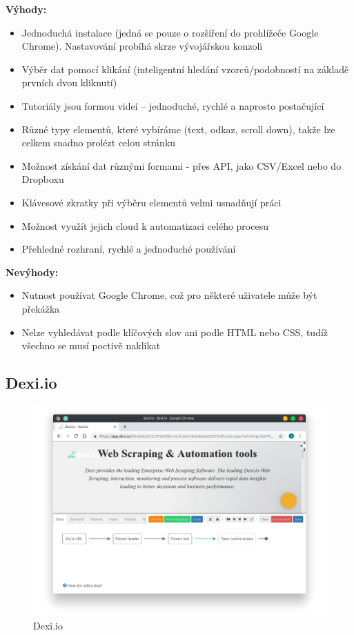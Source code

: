 \documentclass[thesis=B,czech]{FITthesis}[2012/06/26]
\begin{document}
\textbf{Výhody:}
\begin{itemize}
	\item Jednoduchá instalace (jedná se pouze o rozšíření do prohlížeče Google Chrome). Nastavování probíhá skrze vývojářskou konzoli
	\item Výběr dat pomocí klikání (inteligentní hledání vzorců/podobností na základě prvních dvou kliknutí)
	\item Tutoriály jsou formou videí -- jednoduché, rychlé a naprosto postačující
	\item Různé typy elementů, které vybíráme (text, odkaz, scroll down), takže lze celkem snadno prolézt celou stránku
	\item Možnost získání dat různými formami - přes API, jako CSV/Excel nebo do Dropboxu
	\item Klávesové zkratky při výběru elementů velmi usnad\v{n}ují práci
	\item Možnost využít jejich cloud k automatizaci celého procesu
	\item Přehledné rozhraní, rychlé a jednoduché používání
\end{itemize}

\textbf{Nevýhody:}
\begin{itemize}
	\item Nutnost používat Google Chrome, což pro některé uživatele může být překážka
	\item Nelze vyhledávat podle klíčových slov ani podle HTML nebo CSS, tudíž všechno se musí poctivě naklikat
\end{itemize}


\newpage
\subsection{Dexi.io}
\begin{figure}[h!]
	\includegraphics[width=\linewidth]{images/Dexiio.png}
	\caption{Dexi.io}
	\label{fig:dexi.io}
\end{figure}
\end{document}
